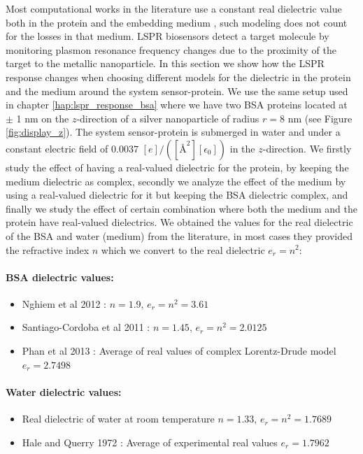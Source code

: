 Most computational works in the literature use a constant real dielectric value both in the protein and the
embedding medium \cite{NghiemETal2012, SantiagoCordobaETal2011,UngerETal2009}, such modeling does not count for the losses 
in that medium. LSPR biosensors detect a target molecule by monitoring plasmon resonance frequency changes due to the proximity 
of the target to the metallic nanoparticle. In this section we show how the LSPR response changes when choosing different models 
for the dielectric in the protein and the medium around the system sensor-protein. We use the same setup used in chapter \ref{hap:lspr_response_bsa}
where we have two BSA proteins located at $\pm$ 1 nm on the $z$-direction of a silver nanoparticle of radius $r=8$ nm (see 
Figure \ref{fig:display_z}). The system sensor-protein is submerged in water and under a constant electric field of 
$0.0037$ $[e]/([{\text{\AA}}^2][\epsilon_0])$ in the $z$-direction. We firstly study the effect of having a real-valued dielectric 
for the protein, by keeping the medium dielectric as complex, secondly we analyze the effect of the medium by using a real-valued 
dielectric for it but keeping the BSA dielectric complex, and finally we study the effect of certain combination where both the medium 
and the protein have real-valued dielectrics. We obtained the values for the real dielectric of the BSA and water (medium) from the literature,
in most cases they provided the refractive index $n$ which we convert to the real dielectric $e_r=n^2$:  

\paragraph{BSA dielectric values:}
\begin{itemize}
    \item {Nghiem et al 2012 \cite{NghiemETal2012}: $n=1.9$, $e_r = n^2 = 3.61$}
    \item {Santiago-Cordoba et al 2011 \cite{SantiagoCordobaETal2011}: $n=1.45$, $e_r = n^2 = 2.0125$}
    \item {Phan et al 2013 \cite{PhanETal2013}: Average of real values of complex Lorentz-Drude model $e_r = 2.7498$}
\end{itemize}

\paragraph{Water dielectric values:}
\begin{itemize}
    \item {Real dielectric of water at room temperature $n=1.33$, $e_r = n^2 = 1.7689$}
    \item {Hale and Querry 1972 \cite{HaleQuerry1972}: Average of experimental real values $e_r = 1.7962$}
\end{itemize}
  

